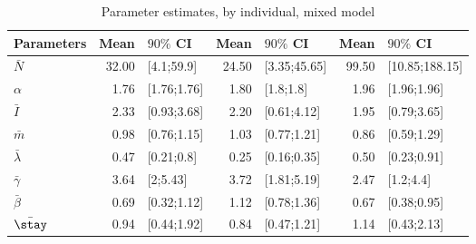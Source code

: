 \begin{table}

\caption{\label{tab:}Parameter estimates, by individual, mixed model}
\centering
\begin{tabular}[t]{lrlrlrl}
\toprule
Parameters & Mean & $90\%$ CI & Mean & $90\%$ CI & Mean & $90\%$ CI\\
\midrule
$\bar{N}$ & 32.00 & [4.1;59.9] & 24.50 & [3.35;45.65] & 99.50 & [10.85;188.15]\\
$\alpha$ & 1.76 & [1.76;1.76] & 1.80 & [1.8;1.8] & 1.96 & [1.96;1.96]\\
$\bar{I}$ & 2.33 & [0.93;3.68] & 2.20 & [0.61;4.12] & 1.95 & [0.79;3.65]\\
$\bar{m}$ & 0.98 & [0.76;1.15] & 1.03 & [0.77;1.21] & 0.86 & [0.59;1.29]\\
$\bar{\lambda}$ & 0.47 & [0.21;0.8] & 0.25 & [0.16;0.35] & 0.50 & [0.23;0.91]\\
\addlinespace
$\bar{\gamma}$ & 3.64 & [2;5.43] & 3.72 & [1.81;5.19] & 2.47 & [1.2;4.4]\\
$\bar{\beta}$ & 0.69 & [0.32;1.12] & 1.12 & [0.78;1.36] & 0.67 & [0.38;0.95]\\
$\bar{\stay}$ & 0.94 & [0.44;1.92] & 0.84 & [0.47;1.21] & 1.14 & [0.43;2.13]\\
\bottomrule
\end{tabular}
\end{table}
